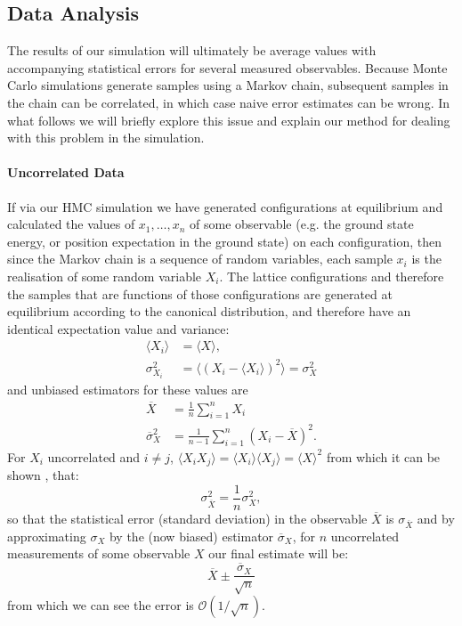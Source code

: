 \documentclass[12pt]{article}
\begin{document}
            \subsection{Data Analysis}
            The results of our simulation will ultimately be average values with accompanying statistical errors for several measured observables. Because Monte Carlo simulations generate samples using a Markov chain, subsequent samples in the chain can be correlated, in which case naive error estimates can be wrong. In what follows we will briefly explore this issue and explain our method for dealing with this problem in the simulation.

            \paragraph{Uncorrelated Data}
            If via our HMC simulation we have generated configurations at equilibrium and calculated the values of $x_1,\dots,x_n$ of some observable (e.g. the ground state energy, or position expectation in the ground state) on each configuration, then since the Markov chain is a sequence of random variables, each sample $x_i$ is the realisation of some random variable $X_i$. The lattice configurations and therefore the samples that are functions of those configurations are generated at equilibrium according to the canonical distribution, and therefore have an identical expectation value and variance:
            \begin{align}
                \langle X_i \rangle & = \langle X \rangle, \\
                \sigma^2_{X_i} & = \langle \left(X_i-\langle X_i\rangle\right)^2 \rangle = \sigma_X^2
            \end{align}
            and unbiased estimators for these values are \cite{gattringer_lang_2013}
            \begin{align}
                \overline{X} & = \frac{1}{n}\sum_{i=1}^{n} X_i \\
                \overline{\sigma}_X^2 & = \frac{1}{n-1}\sum_{i=1}^n\left(X_i-\overline{X}\right)^2.
            \end{align}
            For $X_i$ uncorrelated and $i\neq j$, $\langle X_iX_j \rangle = \langle X_i \rangle \langle X_j \rangle = \langle X \rangle^2$ from which it can be shown \cite{gattringer_lang_2013}, that:
            \begin{equation}
                \label{eq:sdRelation1}
                \sigma^2_{\overline{X}} = \frac{1}{n}\sigma^2_X,
            \end{equation}
            so that the statistical error (standard deviation) in the observable $\overline{X}$ is $\sigma_{\overline{X}}$ and by approximating $\sigma_X$ by the (now biased) estimator $\overline{\sigma}_X$, for $n$ uncorrelated measurements of some observable $X$ our final estimate will be:
            \begin{equation}
                \label{eq:niaveerror}
                \overline{X}\pm \frac{\overline{\sigma}_X}{\sqrt{n}}
            \end{equation}
            from which we can see the error is $\mathcal{O}\left(1/\sqrt{n}\right)$.
\end{document}
